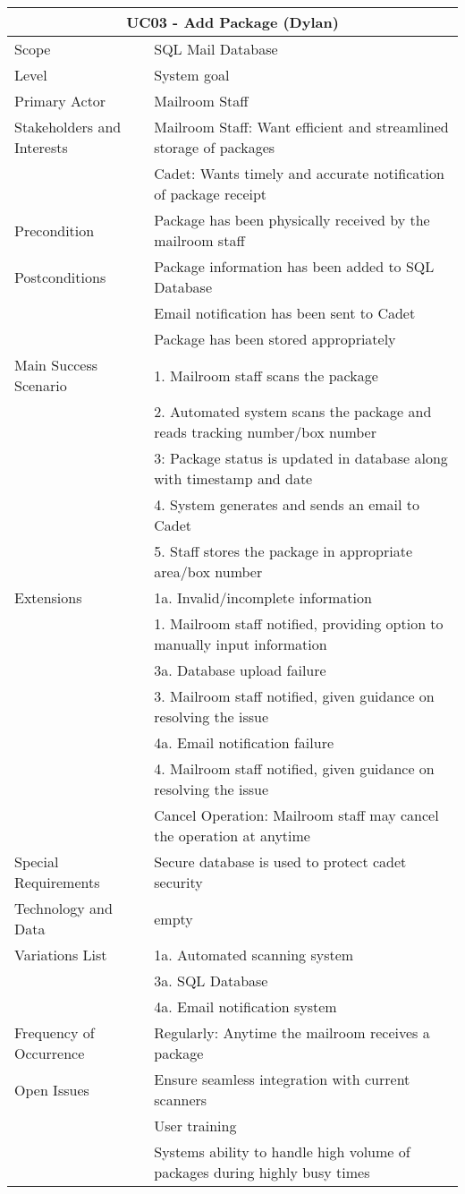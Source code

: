 \documentclass[11pt]{article}
\begin{document}
\begin{table}[tbp]
\vskip-2.0cm\hskip-3.0cm\begin{tabularx}{1.5\textwidth}{|X|X|}
\hline
\multicolumn{2}{|c|}{UC03 - Add Package (Dylan)} \\
\hline
Scope & SQL Mail Database \\
\hline
Level & System goal \\
\hline
Primary Actor & Mailroom Staff \\
\hline
Stakeholders and Interests & Mailroom Staff: Want efficient and streamlined storage of packages \\
 & Cadet: Wants timely and accurate notification of package receipt \\
\hline
Precondition & Package has been physically received by the mailroom staff \\
\hline
Postconditions & Package information has been added to SQL Database \\
 & Email notification has been sent to Cadet \\
 & Package has been stored appropriately \\
\hline
Main Success Scenario & 1. Mailroom staff scans the package \\
 & 2. Automated system scans the package and reads tracking number/box number \\
 & 3: Package status is updated in database along with timestamp and date \\
 & 4. System generates and sends an email to Cadet \\
 & 5. Staff stores the package in appropriate area/box number \\
\hline
Extensions & 1a. Invalid/incomplete information \\
 & 1. Mailroom staff notified, providing option to manually input information \\
 & 3a. Database upload failure \\
 & 3. Mailroom staff notified, given guidance on resolving the issue \\
 & 4a. Email notification failure \\
 & 4. Mailroom staff notified, given guidance on resolving the issue \\
 & Cancel Operation: Mailroom staff may cancel the operation at anytime \\
\hline
Special Requirements & Secure database is used to protect cadet security \\
\hline
Technology and Data & {empty} \\
\hline
Variations List & 1a. Automated scanning system \\
 & 3a. SQL Database \\
 & 4a. Email notification system \\
\hline
Frequency of Occurrence & Regularly: Anytime the mailroom receives a package \\
\hline
Open Issues & Ensure seamless integration with current scanners \\
 & User training \\
 & Systems ability to handle high volume of packages during highly busy times \\
\hline
\end{tabularx}
\end{table}
\end{document}
